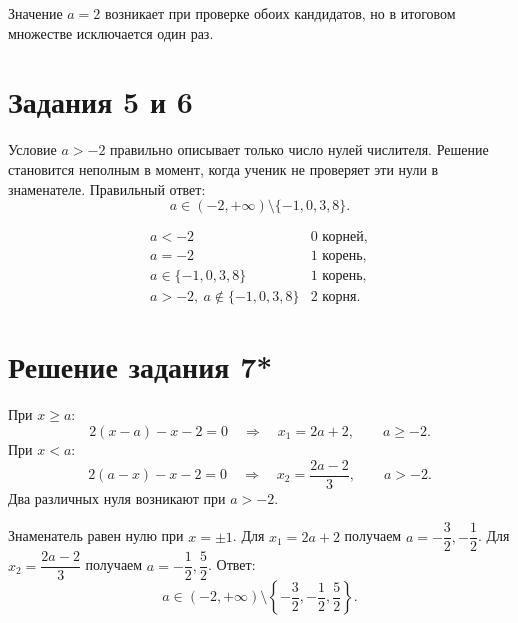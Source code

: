 \begin{criterionbox}
  Значение \(a=2\) возникает при проверке обоих кандидатов, но в итоговом
  множестве исключается один раз.
\end{criterionbox}

\section*{Задания 5 и 6}

\begin{teacheranswer}[Задание 5]
  Условие \(a>-2\) правильно описывает только число нулей числителя. Решение
  становится неполным в момент, когда ученик не проверяет эти нули в
  знаменателе. Правильный ответ:
  \[
    \boxed{a\in(-2,+\infty)\setminus\{-1,0,3,8\}}.
  \]
\end{teacheranswer}

\begin{teacheranswer}[Задание 6]
  \[
    \begin{array}{c|c}
      a<-2 & 0\text{ корней},\\
      a=-2 & 1\text{ корень},\\
      a\in\{-1,0,3,8\} & 1\text{ корень},\\
      a>-2,\ a\notin\{-1,0,3,8\} & 2\text{ корня}.
    \end{array}
  \]
\end{teacheranswer}

\section*{Решение задания 7*}

\begin{teacheranswer}
  При \(x\ge a\):
  \[
    2(x-a)-x-2=0
    \quad\Longrightarrow\quad
    x_1=2a+2,
    \qquad a\ge-2.
  \]
  При \(x<a\):
  \[
    2(a-x)-x-2=0
    \quad\Longrightarrow\quad
    x_2=\frac{2a-2}{3},
    \qquad a>-2.
  \]
  Два различных нуля возникают при \(a>-2\).
\end{teacheranswer}

\begin{teacheranswer}
  Знаменатель равен нулю при \(x=\pm1\).
  Для \(x_1=2a+2\) получаем \(a=-\dfrac32,-\dfrac12\).
  Для \(x_2=\dfrac{2a-2}{3}\) получаем \(a=-\dfrac12,\dfrac52\).
  Ответ:
  \[
    \boxed{
      a\in(-2,+\infty)\setminus
      \left\{-\frac32,-\frac12,\frac52\right\}
    }.
  \]
\end{teacheranswer}

